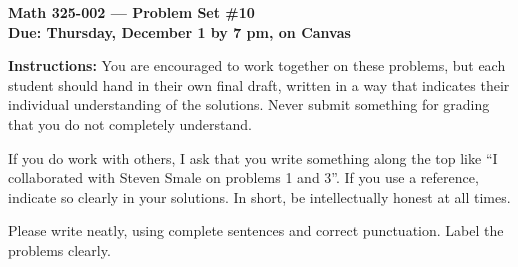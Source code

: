\documentclass{amsart}
\begin{document}
\begin{center}
{\large\bfseries
Math 325-002 --- Problem Set \#10 \\
Due: Thursday, December 1 by 7 pm, on Canvas}
\end{center}





{\bf Instructions:} You are encouraged to work together on these
problems, but each student should hand in their own final draft,
written in a way that indicates their individual understanding of
the solutions. Never submit something for grading
that you do not completely understand. 

If you do work with others, I ask that you write something along the
top like ``I collaborated with Steven Smale on problems 1 and 3''.
If you use a reference, indicate so clearly in your solutions. 
In short, be intellectually
honest at all times.

Please write neatly, using complete sentences and correct
punctuation. Label the problems clearly. 
\end{document}
